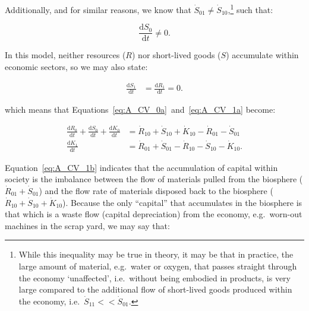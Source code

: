 Additionally,
and for similar reasons, we know that
$\dot{S}_{01} \neq \dot{S}_{10}$,\footnote{While
this inequality may be true in theory,
it may be that in practice,
the large amount of material,
e.g.\ water or oxygen,
that passes straight through the economy `unaffected',
i.e.\ without being embodied in products,
is very large compared to the additional flow of short-lived goods
produced within the economy,
i.e.\ $\dot{S}_{11} << \dot{S}_{01}$.}
such that:

\begin{equation}\label{eq:A_dS0_neq_0}
	\frac{\mathrm{d}S_0}{\mathrm{d}t}
	\neq 0.
\end{equation}




In this model, neither resources ($R$) 
nor short-lived goods ($S$) accumulate within economic sectors, so we may also state:

\begin{align}\label{eq:A-dS_1/dt_zero}
	\frac{\mathrm{d}S_1}{\mathrm{d}t}		&
	= \frac{\mathrm{d}R_1}{\mathrm{d}t}
	= 0.
\end{align}

\noindent{}which means that 
Equations~\ref{eq:A_CV_0a}~and~\ref{eq:A_CV_1a}
become:

\begin{align}\label{eq:A_CV_0b}
	\frac{\mathrm{d}R_0}{\mathrm{d}t}		
	+	\frac{\mathrm{d}S_0}{\mathrm{d}t}
	+	\frac{\mathrm{d}K_0}{\mathrm{d}t}		&	
	=	\dot{R}_{10}		
	+	\dot{S}_{10}	
	+	\dot{K}_{10}											
	-	\dot{R}_{01}											
	-	\dot{S}_{01}								\\
	\label{eq:A_CV_1b}
	\frac{\mathrm{d}K_{1}}{\mathrm{d}t}		&
	= \dot{R}_{01} 
	+ \dot{S}_{01} 
	- \dot{R}_{10}				
	- \dot{S}_{10}				
	- \dot{K}_{10}.										
\end{align}



Equation~\ref{eq:A_CV_1b} indicates that the accumulation 
of capital
within society is the imbalance 
between the flow of materials pulled from the biosphere
($\dot{R}_{01} + \dot{S}_{01}$) and the 
flow rate of materials disposed back to the biosphere 
($\dot{R}_{10} + \dot{S}_{10} + \dot{K}_{10}$). 
Because the only ``capital'' that accumulates in the biosphere
is that which is a waste flow (capital depreciation)
from the economy, e.g.\ worn-out machines in the scrap yard, we may say that:

